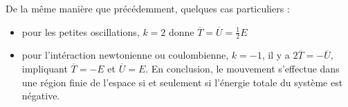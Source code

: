 De la m\^eme mani\`ere que pr\'ec\'edemment, quelques cas particuliers :
\begin{itemize}
	\item pour les petites oscillations, $k=2$ donne $\overline{T} = \overline{U} = \frac{1}{2}E$
	\item pour l'int\'eraction newtonienne ou coulombienne, $k=-1$, il y a $2\overline{T} = -\overline{U}$, impliquant $\overline{T} = -E$ et $\overline{U} = E$. En conclusion, le mouvement s'effectue dans une r\'egion finie de l'espace si et seulement si l'\'energie totale du syst\`eme est n\'egative.
\end{itemize}